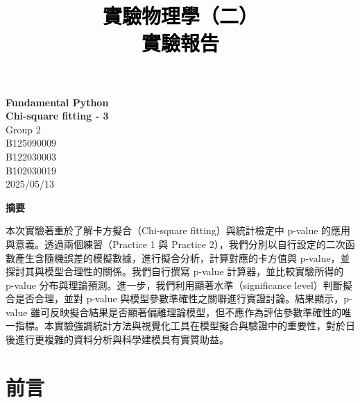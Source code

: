 \documentclass[12pt,a4paper]{article}
\title{\vspace{-0.5cm}
       {\bf \textcolor{black}{{\LARGE 
       \begin{CJK}{UTF8}{bkai}
       實驗物理學（二）\\
       \vspace{6pt}
        實驗報告\\
       \end{CJK}
       }}
       }
       }
\author{}
\date{}
\begin{document}
\begin{CJK}{UTF8}{bkai}

\maketitle
\thispagestyle{empty}

\vspace{10cm}
\begin{center}
{\bf \LARGE \vspace{-11cm} Fundamental Python\\
\vspace{0.25cm} Chi-square fitting - 3}\\
\vspace{13cm}
{\large Group 2}\\ \vspace{12pt}
{\large {} B125090009}\\ \vspace{6pt}
{\large {}  B122030003}\\ \vspace{6pt}
{\large {} B102030019}\\ \vspace{12pt}
{\large 2025/05/13}\\
\end{center}



\clearpage
\vspace{2cm}
\begin{center}
{\large\bf\sc 摘要}
\end{center}

\noindent

本次實驗著重於了解卡方擬合（Chi-square fitting）與統計檢定中 p-value 的應用與意義。透過兩個練習（Practice 1 與 Practice 2），我們分別以自行設定的二次函數產生含隨機誤差的模擬數據，進行擬合分析，計算對應的卡方值與 p-value，並探討其與模型合理性的關係。我們自行撰寫 p-value 計算器，並比較實驗所得的 p-value 分布與理論預測。進一步，我們利用顯著水準（significance level）判斷擬合是否合理，並對 p-value 與模型參數準確性之關聯進行實證討論。結果顯示，p-value 雖可反映擬合結果是否顯著偏離理論模型，但不應作為評估參數準確性的唯一指標。本實驗強調統計方法與視覺化工具在模型擬合與驗證中的重要性，對於日後進行更複雜的資料分析與科學建模具有實質助益。

\section{前言}
\hfill


\end{CJK}
\end{document}
